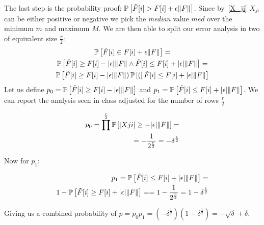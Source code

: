 \label{probability}The last step is the probability proof: $\operatorname*{\mathbb{P}}\left[{\tilde{F}[i] > F[i] + \epsilon \lVert F\rVert}\right]$.
Since by~\ref{X_ji} $X_{ji}$ can be either positive or negative we pick the \emph{median}
value $med$ over the minimum $m$ and maximum $M$.
We are then able to split our error analysis in two of equivalent size $\frac{r}{2}$:
\begin{gather*}
\operatorname*{\mathbb{P}}\left[{\tilde{F}[i] \in F[i] + \epsilon \lVert F\rVert}\right] = \\
\operatorname*{\mathbb{P}}\left[{\tilde{F}[i] \geq F[i] - \lvert\epsilon\rvert \lVert F\rVert \wedge \tilde{F}[i] \leq F[i] + \lvert\epsilon\rvert \lVert F\rVert}\right] = \\
\operatorname*{\mathbb{P}}\left[{\tilde{F}[i] \geq F[i] - \lvert\epsilon\rvert \lVert F\rVert) \operatorname*{\mathbb{P}}\left[{(}\right]\tilde{F}[i] \leq F[i] + \lvert\epsilon\rvert \lVert F\rVert}\right]
\end{gather*}
Let us define $p_0 = \operatorname*{\mathbb{P}}\left[{\tilde{F}[i] \geq F[i] - \lvert\epsilon\rvert \lVert F\rVert}\right]$ and
$p_1 = \operatorname*{\mathbb{P}}\left[{\tilde{F}[i] \leq F[i] + \lvert\epsilon\rvert \lVert F\rVert}\right]$.
We can report the analysis seen in class adjusted for the number of rows $\frac{r}{2}$

\begin{align*}
p_0 = \prod^{\frac{r}{2}}\operatorname*{\mathbb{P}}\left[{|Xji| \geq - \lvert\epsilon\rvert \lVert F\rVert}\right] = \\
    = - \frac{1}{2^{\frac{r}{2}}} = - \delta^{\frac{1}{2}}
\end{align*}

Now for $p_1$:

\begin{align*}
    p_1 = \operatorname*{\mathbb{P}}\left[{\tilde{F}[i] \leq F[i] + \lvert\epsilon\rvert \lVert F\rVert}\right] = \\
    1 - \operatorname*{\mathbb{P}}\left[{\tilde{F}[i] \geq F[i] + \lvert\epsilon\rvert \lVert F\rVert}\right] =
    = 1 - \frac{1}{2^{\frac{r}{2}}} = 1 - \delta^{\frac{1}{2}}
\end{align*}

Giving us a combined probability of $p = p_0 p_1 =
(- \delta^{\frac{1}{2}}) (1 - \delta^{\frac{1}{2}}) = -\sqrt{\delta} + \delta$.
